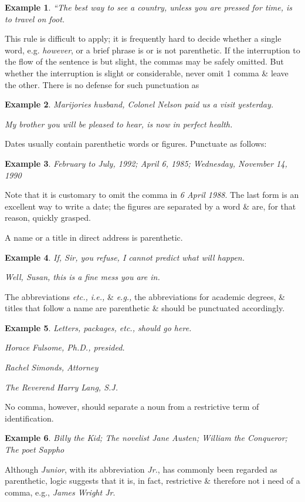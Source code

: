 \documentclass[oneside]{book}
\numberwithin{equation}{section}
\newtheorem{example}{Example}[chapter]
\begin{document}
\begin{example}
	``The best way to see a country, unless you are pressed for time, is to travel on foot.
\end{example}
This rule is difficult to apply; it is frequently hard to decide whether a single word, e.g. \textit{however}, or a brief phrase is or is not parenthetic. If the interruption to the flow of the sentence is but slight, the commas may be safely omitted. But whether the interruption is slight or considerable, never omit 1 comma \& leave the other. There is no defense for such punctuation as

\begin{example}
	Marijories husband, Colonel Nelson paid us a visit yesterday.
	
	My brother you will be pleased to hear, is now in perfect health.
\end{example}
Dates usually contain parenthetic words or figures. Punctuate as follows:

\begin{example}
	February to July, 1992; April 6, 1985; Wednesday, November 14, 1990
\end{example}
Note that it is customary to omit the comma in \textit{6 April 1988}. The last form is an excellent way to write a date; the figures are separated by a word \& are, for that reason, quickly grasped.

A name or a title in direct address is parenthetic.

\begin{example}
	If, Sir, you refuse, I cannot predict what will happen.
	
	Well, Susan, this is a fine mess you are in.
\end{example}
The abbreviations \textit{etc., i.e.,} \& \textit{e.g.,} the abbreviations for academic degrees, \& titles that follow a name are parenthetic \& should be punctuated accordingly.

\begin{example}
	Letters, packages, etc., should go here.
	
	Horace Fulsome, Ph.D., presided.
	
	Rachel Simonds, Attorney
	
	The Reverend Harry Lang, S.J.
\end{example}
No comma, however, should separate a noun from a restrictive term of identification.

\begin{example}
	Billy the Kid; The novelist Jane Austen; William the Conqueror; The poet Sappho
\end{example}
Although \textit{Junior}, with its abbreviation \textit{Jr.}, has commonly been regarded as parenthetic, logic suggests that it is, in fact, restrictive \& therefore not i need of a comma, e.g., \textit{James Wright Jr}.
\end{document}
